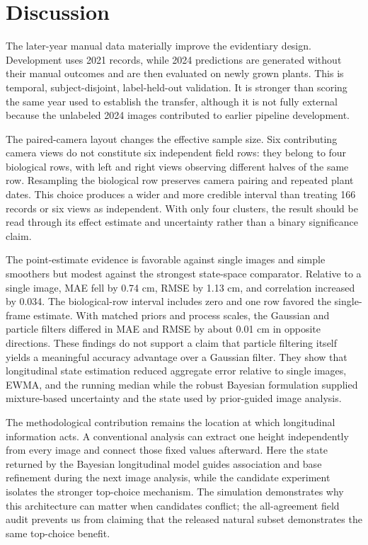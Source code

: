 \documentclass[review,12pt,authoryear]{elsarticle}
\begin{document}
\section{Discussion}

The later-year manual data materially improve the evidentiary design. Development uses 2021 records, while 2024 predictions are generated without their manual outcomes and are then evaluated on newly grown plants. This is temporal, subject-disjoint, label-held-out validation. It is stronger than scoring the same year used to establish the transfer, although it is not fully external because the unlabeled 2024 images contributed to earlier pipeline development.

The paired-camera layout changes the effective sample size. Six contributing camera views do not constitute six independent field rows: they belong to four biological rows, with left and right views observing different halves of the same row. Resampling the biological row preserves camera pairing and repeated plant dates. This choice produces a wider and more credible interval than treating 166 records or six views as independent. With only four clusters, the result should be read through its effect estimate and uncertainty rather than a binary significance claim.

The point-estimate evidence is favorable against single images and simple smoothers but modest against the strongest state-space comparator. Relative to a single image, MAE fell by 0.74 cm, RMSE by 1.13 cm, and correlation increased by 0.034. The biological-row interval includes zero and one row favored the single-frame estimate. With matched priors and process scales, the Gaussian and particle filters differed in MAE and RMSE by about 0.01 cm in opposite directions. These findings do not support a claim that particle filtering itself yields a meaningful accuracy advantage over a Gaussian filter. They show that longitudinal state estimation reduced aggregate error relative to single images, EWMA, and the running median while the robust Bayesian formulation supplied mixture-based uncertainty and the state used by prior-guided image analysis.

The methodological contribution remains the location at which longitudinal information acts. A conventional analysis can extract one height independently from every image and connect those fixed values afterward. Here the state returned by the Bayesian longitudinal model guides association and base refinement during the next image analysis, while the candidate experiment isolates the stronger top-choice mechanism. The simulation demonstrates why this architecture can matter when candidates conflict; the all-agreement field audit prevents us from claiming that the released natural subset demonstrates the same top-choice benefit.
\end{document}
